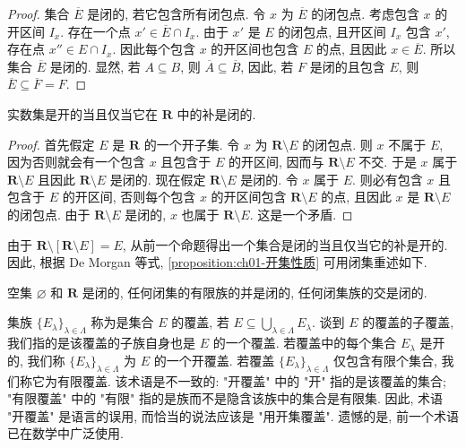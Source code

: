 \documentclass[../../main.tex]{subfiles}
\begin{document}
\begin{proof}
集合 $\overline{E}$ 是闭的, 若它包含所有闭包点. 令 $x$ 为 $\overline{E}$ 的闭包点. 考虑包含 $x$ 的开区间 $I_{x}$. 存在一个点 $x'\in\overline{E}\cap I_{x}$. 由于 $x'$ 是 $E$ 的闭包点, 且开区间 $I_{x}$ 包含 $x'$, 存在点 $x''\in E\cap I_{x}$. 因此每个包含 $x$ 的开区间也包含 $E$ 的点, 且因此 $x\in\overline{E}$. 所以集合 $\overline{E}$ 是闭的. 显然, 若 $A\subseteq B$, 则 $\overline{A}\subseteq\overline{B}$, 因此, 若 $F$ 是闭的且包含 $E$, 则 $\overline{E}\subseteq\overline{F}=F$.
\end{proof}

\begin{proposition}\label{proposition:ch01-开闭互补}
实数集是开的当且仅当它在 $\mathbf{R}$ 中的补是闭的.
\end{proposition}

\begin{proof}
首先假定 $E$ 是 $\mathbf{R}$ 的一个开子集. 令 $x$ 为 $\mathbf{R}\setminus E$ 的闭包点. 则 $x$ 不属于 $E$, 因为否则就会有一个包含 $x$ 且包含于 $E$ 的开区间, 因而与 $\mathbf{R}\setminus E$ 不交. 于是 $x$ 属于 $\mathbf{R}\setminus E$ 且因此 $\mathbf{R}\setminus E$ 是闭的. 现在假定 $\mathbf{R}\setminus E$ 是闭的. 令 $x$ 属于 $E$. 则必有包含 $x$ 且包含于 $E$ 的开区间, 否则每个包含 $x$ 的开区间包含 $\mathbf{R}\setminus E$ 的点, 且因此 $x$ 是 $\mathbf{R}\setminus E$ 的闭包点. 由于 $\mathbf{R}\setminus E$ 是闭的, $x$ 也属于 $\mathbf{R}\setminus E$. 这是一个矛盾.
\end{proof}

由于 $\mathbf{R}\setminus[\mathbf{R}\setminus E]=E$, 从前一个命题得出一个集合是闭的当且仅当它的补是开的. 因此, 根据 De Morgan 等式, \cref{proposition:ch01-开集性质} 可用闭集重述如下.

\begin{proposition}\label{proposition:ch01-闭集性质}
空集 $\varnothing$ 和 $\mathbf{R}$ 是闭的, 任何闭集的有限族的并是闭的, 任何闭集族的交是闭的.
\end{proposition}

集族 $\{E_{\lambda}\}_{\lambda\in\Lambda}$ 称为是集合 $E$ 的覆盖, 若 $E\subseteq\bigcup_{\lambda\in\Lambda}E_{\lambda}$. 谈到 $E$ 的覆盖的子覆盖, 我们指的是该覆盖的子族自身也是 $E$ 的一个覆盖. 若覆盖中的每个集合 $E_{\lambda}$ 是开的, 我们称 $\{E_{\lambda}\}_{\lambda\in\Lambda}$ 为 $E$ 的一个开覆盖. 若覆盖 $\{E_{\lambda}\}_{\lambda\in\Lambda}$ 仅包含有限个集合, 我们称它为有限覆盖. 该术语是不一致的: "开覆盖" 中的 "开" 指的是该覆盖的集合; "有限覆盖" 中的 "有限" 指的是族而不是隐含该族中的集合是有限集. 因此, 术语 "开覆盖" 是语言的误用, 而恰当的说法应该是 "用开集覆盖". 遗憾的是, 前一个术语已在数学中广泛使用.
\end{document}
